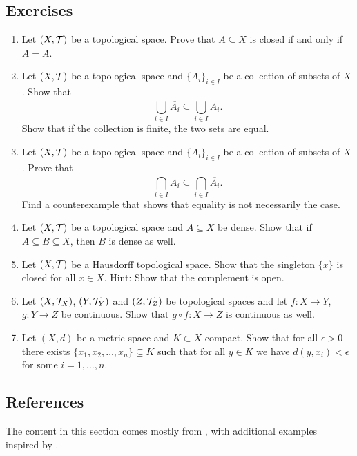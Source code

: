 \documentclass{article}
\begin{document}
\subsection{Exercises}
\begin{enumerate}
    \item Let $(X, \mathcal{T})$ be a topological space. Prove that $A\subseteq X$ is closed if and only if $\overline{A} =A$.
    \item Let $(X,\mathcal{T})$ be a topological space and $\{A_i\}_{i\in I}$ be a collection of subsets of $X$. Show that 
    \begin{equation*}
        \bigcup_{i\in I}\overline{A_i} \subseteq \overline{\bigcup_{i\in I}A_i}.
    \end{equation*}
    Show that if the collection is finite, the two sets are equal. 
    \item Let $(X,\mathcal{T})$ be a topological space and $\{A_i\}_{i\in I}$ be a collection of subsets of $X$. Prove that 
    \begin{equation*}
        \overline{\bigcap_{i\in I}A_i} \subseteq \bigcap_{i\in I}\overline{A_i}.
    \end{equation*}
    Find a counterexample that shows that equality is not necessarily the case.
    \item Let $(X,\mathcal{T})$ be a topological space and $A\subseteq X$ be dense. Show that if $A\subseteq B\subseteq X$, then $B$ is dense as well. 
    \item Let $(X,\mathcal{T})$ be a Hausdorff topological space. Show that the singleton $\{x\}$ is closed for all $x\in X$. Hint: Show that the complement is open. 
    \item Let $(X,\mathcal{T}_X)$, $(Y,\mathcal{T}_Y)$ and $(Z,\mathcal{T}_Z)$ be topological spaces and let $f\colon X\to Y$, $g\colon Y \to Z$ be continuous. Show that $g\circ f \colon X \to Z$ is continuous as well. 
    \item Let $(X, d)$ be a metric space and $K \subset X$ compact. Show that for all $\epsilon>0$ there exists $\{x_1,x_2,\ldots, x_n\}\subseteq K$  such that for all $y\in K$ we have $d(y,x_i)<\epsilon$ for some $i=1,\ldots,n$.
\end{enumerate}

\subsection{References}
The content in this section comes mostly from \cite{tastetopology}, with additional examples inspired by \cite{marcoux2019}.
\end{document}
